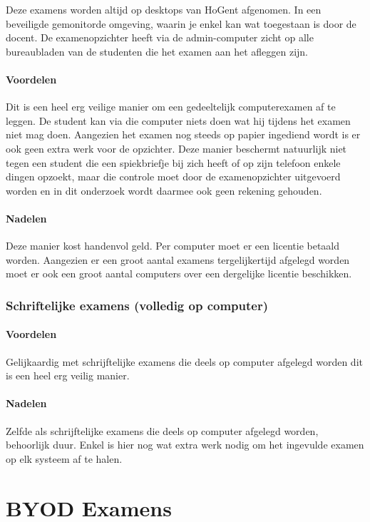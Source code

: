 Deze examens worden altijd op desktops van HoGent afgenomen. In een beveiligde gemonitorde omgeving, waarin je enkel kan wat toegestaan is door de docent. De examenopzichter heeft via de admin-computer zicht op alle bureaubladen van de studenten die het examen aan het afleggen zijn. 

\paragraph{Voordelen}
Dit is een heel erg veilige manier om een gedeeltelijk computerexamen af te leggen. De student kan via die computer niets doen wat hij tijdens het examen niet mag doen. Aangezien het examen nog steeds op papier ingediend wordt is er ook geen extra werk voor de opzichter. Deze manier beschermt natuurlijk niet tegen een student die een spiekbriefje bij zich heeft of op zijn telefoon enkele dingen opzoekt, maar die controle moet door de examenopzichter uitgevoerd worden en in dit onderzoek wordt daarmee ook geen rekening gehouden.

\paragraph{Nadelen}
Deze manier kost handenvol geld. Per computer moet er een licentie betaald worden. Aangezien er een groot aantal examens tergelijkertijd afgelegd worden moet er ook een groot aantal computers over een dergelijke licentie beschikken.


\subsubsection{Schriftelijke examens (volledig op computer)}

\paragraph{Voordelen}
Gelijkaardig met schrijftelijke examens die deels op computer afgelegd worden dit is een heel erg veilig manier.

\paragraph{Nadelen}
Zelfde als schrijftelijke examens die deels op computer afgelegd worden, behoorlijk duur. Enkel is hier nog wat extra werk nodig om het ingevulde examen op elk systeem af te halen.


\section{BYOD Examens}

